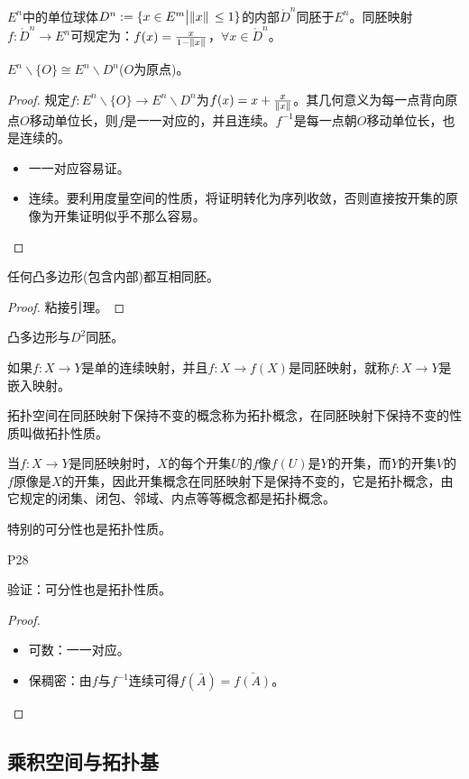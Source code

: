 \begin{example}
    $E^n$中的单位球体$D^n:=\{x\in E^m\big| \norm*{x}\leq 1\}$的内部$\mathring{D}^n$同胚于$E^n$。同胚映射$f:\mathring{D}^n\rightarrow E^n$可规定为：$f(x)=\frac{x}{1-\norm*{x}}$，$\forall x\in \mathring{D}^n$。
\end{example}

\begin{example}
    $E^n\backslash \{O\}\cong E^n\backslash D^n$($O$为原点)。
\end{example}

\begin{proof}
    规定$f:E^n\backslash \{O\}\rightarrow E^n\backslash D^n$为$f(x)=x+\frac{x}{\norm*{x}}$。其几何意义为每一点背向原点$O$移动单位长，则$f$是一一对应的，并且连续。$f^{-1}$是每一点朝$O$移动单位长，也是连续的。
    \par
    \begin{itemize}
        \item 一一对应容易证。
        \item 连续。要利用度量空间的性质，将证明转化为序列收敛，否则直接按开集的原像为开集证明似乎不那么容易。
    \end{itemize}
\end{proof}

\begin{example}
    任何凸多边形(包含内部)都互相同胚。
\end{example}
\begin{proof}
    粘接引理。
\end{proof}

\begin{example}
    凸多边形与$D^2$同胚。
\end{example}

\begin{definition}
    如果$f:X\rightarrow Y$是单的连续映射，并且$f:X\rightarrow f(X)$是同胚映射，就称$f:X\rightarrow Y$是嵌入映射。
\end{definition}

\begin{definition}
    拓扑空间在同胚映射下保持不变的概念称为拓扑概念，在同胚映射下保持不变的性质叫做拓扑性质。
\end{definition}

\original
{
    当$f:X\rightarrow Y$是同胚映射时，$X$的每个开集$U$的$f$像$f(U)$是$Y$的开集，而$Y$的开集$V$的$f$原像是$X$的开集，因此开集概念在同胚映射下是保持不变的，它是拓扑概念，由它规定的闭集、闭包、邻域、内点等等概念都是拓扑概念。
    \par
    特别的可分性也是拓扑性质。
}
{P28}

\begin{proposition}
    验证：可分性也是拓扑性质。
\end{proposition}

\begin{proof}
    \begin{itemize}
        \item 可数：一一对应。
        \item 保稠密：由$f$与$f^{-1}$连续可得$f(\bar{A})=\bar{f(A)}$。
    \end{itemize}
\end{proof}

\subsection{乘积空间与拓扑基}

